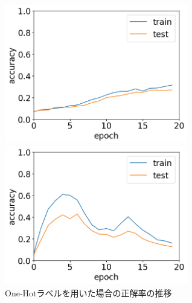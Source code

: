 \documentclass[11pt,a4paper,uplatex]{ujarticle}
\begin{document}
  \begin{figure}[tbp]
    \begin{minipage}[b]{0.495\textwidth}
      \centering
      \includegraphics[keepaspectratio, width=80mm]{Images/python/acc_202402051754.png}
    \end{minipage}
    \begin{minipage}[b]{0.495\textwidth}
      \centering
      \includegraphics[keepaspectratio, width=80mm]{Images/python/acc_202402052233.png}
    \end{minipage}
    \caption{One-Hotラベルを用いた場合の正解率の推移}
  \end{figure}
\end{document}
